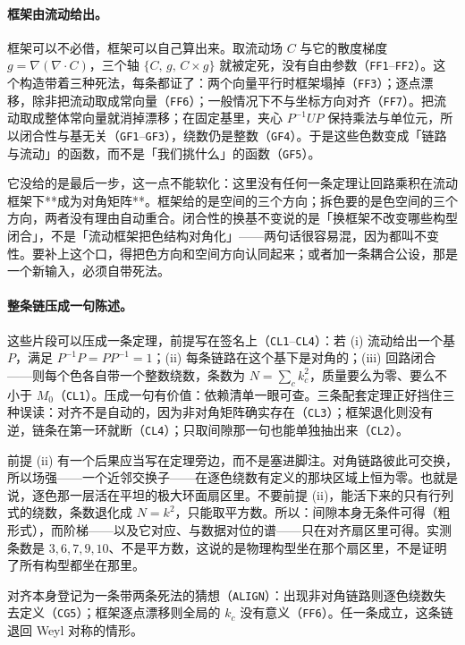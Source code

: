 \documentclass[aps,prd,preprint,superscriptaddress,amsmath,amssymb]{revtex4-2}
\begin{document}
\paragraph{框架由流动给出。}
框架可以不必借，框架可以自己算出来。取流动场 $C$ 与它的散度梯度 $g=\nabla(\nabla\cdot C)$，三个轴 $\{C,\,g,\,C\times g\}$ 就被定死，没有自由参数（\texttt{FF1}--\texttt{FF2}）。这个构造带着三种死法，每条都证了：两个向量平行时框架塌掉（\texttt{FF3}）；逐点漂移，除非把流动取成常向量（\texttt{FF6}）；一般情况下不与坐标方向对齐（\texttt{FF7}）。把流动取成整体常向量就消掉漂移；在固定基里，夹心 $P^{-1}UP$ 保持乘法与单位元，所以闭合性与基无关（\texttt{GF1}--\texttt{GF3}），绕数仍是整数（\texttt{GF4}）。于是这些色数变成「链路与流动」的函数，而不是「我们挑什么」的函数（\texttt{GF5}）。

它没给的是最后一步，这一点不能软化：这里没有任何一条定理让回路乘积在流动框架下**成为对角矩阵**。框架给的是空间的三个方向；拆色要的是色空间的三个方向，两者没有理由自动重合。闭合性的换基不变说的是「换框架不改变哪些构型闭合」，不是「流动框架把色结构对角化」——两句话很容易混，因为都叫不变性。要补上这个口，得把色方向和空间方向认同起来；或者加一条耦合公设，那是一个新输入，必须自带死法。

\paragraph{整条链压成一句陈述。}
这些片段可以压成一条定理，前提写在签名上（\texttt{CL1}--\texttt{CL4}）：若 (i) 流动给出一个基 $P$，满足 $P^{-1}P=PP^{-1}=1$；(ii) 每条链路在这个基下是对角的；(iii) 回路闭合——则每个色各自带一个整数绕数，条数为 $N=\sum_c k_c^2$，质量要么为零、要么不小于 $M_0$（\texttt{CL1}）。压成一句有价值：依赖清单一眼可查。三条配套定理正好挡住三种误读：对齐不是自动的，因为非对角矩阵确实存在（\texttt{CL3}）；框架退化则没有逆，链条在第一环就断（\texttt{CL4}）；只取间隙那一句也能单独抽出来（\texttt{CL2}）。

前提 (ii) 有一个后果应当写在定理旁边，而不是塞进脚注。对角链路彼此可交换，所以场强——一个近邻交换子——在逐色绕数有定义的那块区域上恒为零。也就是说，逐色那一层活在平坦的极大环面扇区里。不要前提 (ii)，能活下来的只有行列式的绕数，条数退化成 $N=k^2$，只能取平方数。所以：间隙本身无条件可得（粗形式），而阶梯——以及它对应、与数据对位的谱——只在对齐扇区里可得。实测条数是 $3,6,7,9,10$、不是平方数，这说的是物理构型坐在那个扇区里，不是证明了所有构型都坐在那里。

对齐本身登记为一条带两条死法的猜想（\texttt{ALIGN}）：出现非对角链路则逐色绕数失去定义（\texttt{CG5}）；框架逐点漂移则全局的 $k_c$ 没有意义（\texttt{FF6}）。任一条成立，这条链退回 Weyl 对称的情形。
\end{document}
